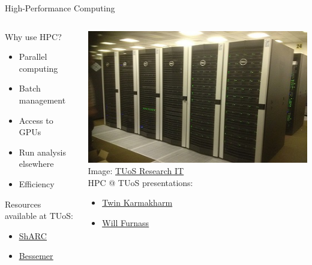 \documentclass{beamer} %
\begin{document}
  \begin{frame}[label=HPC]{High-Performance Computing}
    \begin{columns}
      \begin{column}{0.5\textwidth}
        Why use HPC?
        \begin{itemize}
          \item Parallel computing
          \item Batch management
          \item Access to GPUs
          \item Run analysis elsewhere
          \item Efficiency
        \end{itemize}

        \vspace{1cm}

        Resources available at TUoS:
        \begin{itemize}
          \item \href{https://docs.hpc.shef.ac.uk/en/latest/sharc/index.html}{\underline{ShARC}}
          \item \href{https://docs.hpc.shef.ac.uk/en/latest/bessemer/index.html}{\underline{Bessemer}}
        \end{itemize}
      \end{column}
      
      \begin{column}{0.5\textwidth}
        \includegraphics[width=\textwidth]{iceberg2014.jpg}
        \tiny
        Image: \href{https://www.sheffield.ac.uk/it-services/research/hpc/sharc}{TUoS Research IT}
        \small
        \\\vspace{1cm}
        HPC @ TUoS presentations:
        \begin{itemize}
          \item \href{https://rse.shef.ac.uk/uos-hpc-resources-presentation/}{\underline{Twin Karmakharm}}
          \item \href{https://rse.shef.ac.uk/rse-dcs-pres-on-hpc/}{\underline{Will Furnass}}
        \end{itemize}
      \end{column}
    \end{columns}
  \end{frame}
\end{document}
